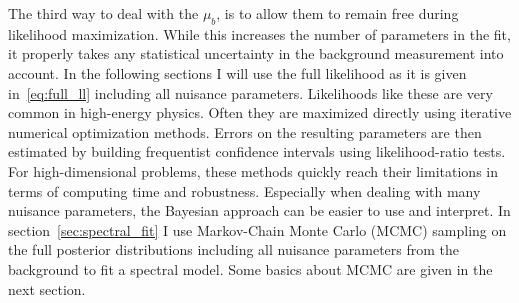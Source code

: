 The third way to deal with the $\mu_b$, is to allow them to remain free during likelihood maximization. While this increases the number of parameters in the fit,
it properly takes any statistical uncertainty in the background measurement into account. In the following sections I will use the full likelihood as it is 
given in~\eqref{eq:full_ll} including all nuisance parameters. Likelihoods like these are very common in high-energy physics. Often they 
are maximized directly using iterative numerical optimization methods. Errors on the resulting parameters are then estimated by building
frequentist confidence intervals using likelihood-ratio tests. 
For high-dimensional problems, these methods quickly reach their limitations in terms of computing time and robustness.  
Especially when dealing with many nuisance parameters, the Bayesian approach can be easier to use and interpret. 
In section~\ref{sec:spectral_fit} I use Markov-Chain Monte Carlo (MCMC) sampling on the full posterior distributions including all nuisance parameters from the background to fit a spectral model.
Some basics about MCMC are given in the next section.


